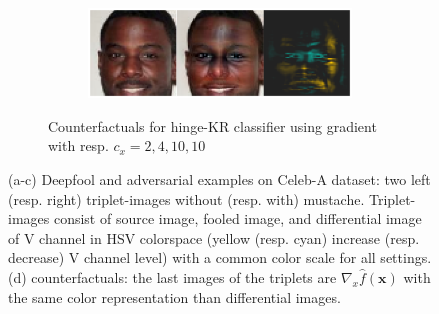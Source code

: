 \documentclass{article}
\begin{document}
\begin{figure}
\begin{subfigure}{1.\textwidth}
\begin{subfigure}{.245\textwidth}
      \centering
      \includegraphics[width=1\linewidth]{img/remove_mustache_6950_k10.png}
      \label{fig:AddingMoustache_grad_4_OK}
    \end{subfigure}
    \caption{Counterfactuals for hinge-KR classifier using gradient with resp. $c_x=2,4,10,10$}
\end{subfigure}
\caption{(a-c) Deepfool and adversarial examples  on Celeb-A dataset: two left (resp. right) triplet-images without (resp. with) mustache. Triplet-images consist of source image, fooled image, and differential image of V channel in HSV colorspace (yellow (resp. cyan) increase (resp. decrease) V channel level) with a common color scale for all settings. (d) counterfactuals: the last images of the triplets are $\nabla_x \hat{f}(\textbf{x})$ with the same color representation than differential images.}
\label{fig:Deep_fool_CelebA}
\end{figure}

\end{document}
